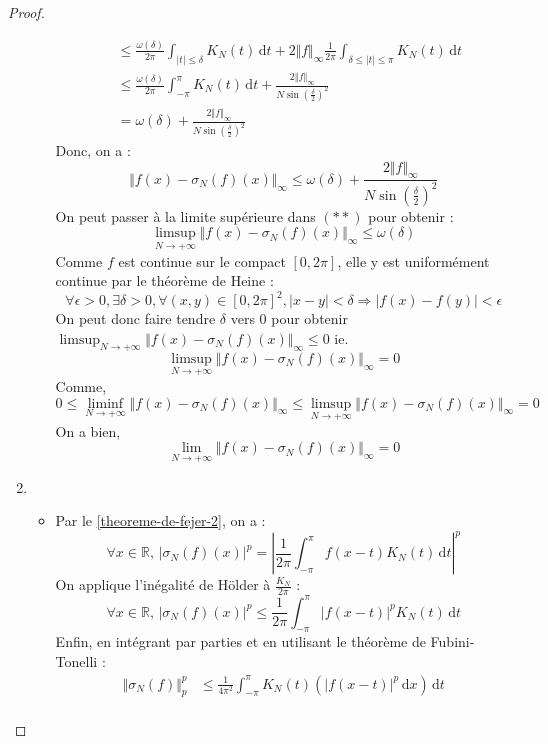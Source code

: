 \begin{proof}
\begin{enumerate}[label=(\roman*)]
\begin{itemize}
\begin{align*}
					&\leq \frac{\omega(\delta)}{2\pi} \int_{\vert t \vert \leq \delta} K_N(t) \, \mathrm{d}t + 2 \Vert f \Vert_\infty \frac{1}{2\pi} \int_{\delta \leq \vert t \vert \leq \pi} K_N(t) \, \mathrm{d}t \\
					&\leq \frac{\omega(\delta)}{2\pi} \int_{-\pi}^{\pi} K_N(t) \, \mathrm{d}t + \frac{2 \Vert f \Vert_\infty}{N \sin \left(\frac{\delta}{2} \right)^2} \\
					&= \omega(\delta) + \frac{2 \Vert f \Vert_\infty}{N \sin \left(\frac{\delta}{2} \right)^2}
				\end{align*}
				Donc, on a :
				\[ \Vert f(x) - \sigma_N(f)(x) \Vert_\infty \leq \omega(\delta) + \frac{2 \Vert f \Vert_\infty}{N \sin \left(\frac{\delta}{2} \right)^2} \tag{**} \]
				On peut passer à la limite supérieure dans $(**)$ pour obtenir :
				\[ \limsup_{N \rightarrow +\infty} \Vert f(x) - \sigma_N(f)(x) \Vert_\infty \leq \omega(\delta) \]
				Comme $f$ est continue sur le compact $[0,2\pi]$, elle y est uniformément continue par le théorème de Heine :
				\[ \forall \epsilon>0, \exists \delta>0, \forall(x,y)\in[0,2\pi]^2, |x-y|<\delta\Rightarrow |f(x)-f(y)|<\epsilon \]
				On peut donc faire tendre $\delta$ vers $0$ pour obtenir $\limsup_{N \rightarrow +\infty} \Vert f(x) - \sigma_N(f)(x) \Vert_\infty \leq 0$
				ie.
				\[ \limsup_{N \rightarrow +\infty} \Vert f(x) - \sigma_N(f)(x) \Vert_\infty = 0 \]
				Comme,
				\[ 0 \leq \liminf_{N \rightarrow +\infty} \Vert f(x) - \sigma_N(f)(x) \Vert_\infty \leq \limsup_{N \rightarrow +\infty} \Vert f(x) - \sigma_N(f)(x) \Vert_\infty = 0 \]
				On a bien,
				\[ \lim_{N \rightarrow +\infty} \Vert f(x) - \sigma_N(f)(x) \Vert_\infty = 0 \]
			\end{itemize}
			\item \begin{itemize}
				\item Par le \cref{theoreme-de-fejer-2}, on a :
				\[ \forall x \in \mathbb{R}, \, \vert \sigma_N(f)(x) \vert^p = \left \vert \frac{1}{2\pi} \int_{-\pi}^{\pi} f(x-t) K_N(t) \, \mathrm{d}t \right \vert^p \]
				On applique l'inégalité de Hölder à $\frac{K_N}{2\pi}$ :
				\[ \forall x \in \mathbb{R}, \, \vert \sigma_N(f)(x) \vert^p \leq \frac{1}{2\pi} \int_{-\pi}^{\pi} \vert f(x-t) \vert^p K_N(t) \, \mathrm{d}t \]
				Enfin, en intégrant par parties et en utilisant le théorème de Fubini-Tonelli :
				\begin{align*}
					\Vert \sigma_N(f) \Vert_p^p &\leq \frac{1}{4\pi^2} \int_{-\pi}^{\pi} K_N(t) \left( \vert f(x-t) \vert^p \, \mathrm{d}x \right) \, \mathrm{d}t \\

\end{align*}
\end{itemize}
\end{enumerate}
\end{proof}
